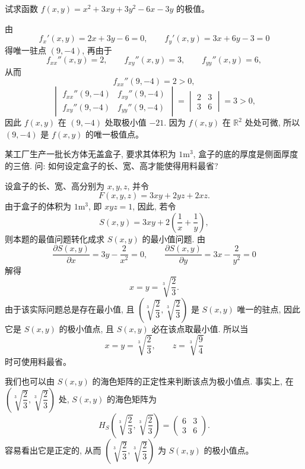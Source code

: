 \documentclass[UTF8,12pt,a4paper,fontset=fandol]{ctexart}
\begin{document}
\begin{example}\label{course-example-14-5-1}\quad 试求函数 $f(x,y)=x^2+3xy+3y^2-6x-3y$ 的极值。

\end{example}
\begin{solve}\quad 由
\[
  f_x'(x,y)=2x+3y-6=0,\qquad
  f_y'(x,y)=3x+6y-3=0
\]
得唯一驻点 $(9,-4)$, 再由于
\[
  f_{xx}''(x,y)=2,\qquad f_{xy}''(x,y)=3,\qquad f_{yy}''(x,y)=6,
\]
从而
\[
  f_{xx}''(9,-4)=2>0,
\]
\[
  \begin{vmatrix}
    f_{xx}''(9,-4) & f_{xy}''(9,-4)\\
    f_{xy}''(9,-4) & f_{yy}''(9,-4)
  \end{vmatrix}
  =
  \begin{vmatrix}
    2 & 3\\
    3 & 6
  \end{vmatrix}
  =3>0,
\]
因此 $f(x,y)$ 在 $(9,-4)$ 处取极小值 $-21$. 因为 $f(x,y)$ 在 $\mathbb R^2$ 处处可微, 所以 $(9,-4)$ 是 $f(x,y)$ 的唯一极值点。

\end{solve}
\begin{example}\label{course-example-14-5-2}\quad 某工厂生产一批长方体无盖盒子, 要求其体积为 $1\mathrm{m}^3$, 盒子的底的厚度是侧面厚度的三倍. 问: 如何设定盒子的长、宽、高才能使得用料最省?

\end{example}
\begin{solve}\quad 设盒子的长、宽、高分别为 $x,y,z$, 并令
\[
  F(x,y,z)=3xy+2yz+2xz.
\]
由于盒子的体积为 $1\mathrm{m}^3$, 即 $xyz=1$, 因此, 若令
\[
  S(x,y)=3xy+2\left(\frac1x+\frac1y\right),
\]
则本题的最值问题转化成求 $S(x,y)$ 的最小值问题. 由
\[
  \frac{\partial S(x,y)}{\partial x}=3y-\frac2{x^2}=0,\qquad
  \frac{\partial S(x,y)}{\partial y}=3x-\frac2{y^2}=0
\]
解得
\[
  x=y=\sqrt[3]{\frac23}.
\]
由于该实际问题总是存在最小值, 且 $\left(\sqrt[3]{\dfrac23},\sqrt[3]{\dfrac23}\right)$ 是 $S(x,y)$ 唯一的驻点, 因此它是 $S(x,y)$ 的极小值点, 且 $S(x,y)$ 必在该点取最小值. 所以当
\[
  x=y=\sqrt[3]{\frac23},\qquad z=\sqrt[3]{\frac94}
\]
时可使用料最省。

我们也可以由 $S(x,y)$ 的海色矩阵的正定性来判断该点为极小值点. 事实上, 在 $\left(\sqrt[3]{\dfrac23},\sqrt[3]{\dfrac23}\right)$ 处, $S(x,y)$ 的海色矩阵为
\[
  H_S\left(\sqrt[3]{\frac23},\sqrt[3]{\frac23}\right)
  =
  \begin{pmatrix}
    6 & 3\\
    3 & 6
  \end{pmatrix}.
\]
容易看出它是正定的, 从而 $\left(\sqrt[3]{\dfrac23},\sqrt[3]{\dfrac23}\right)$ 为 $S(x,y)$ 的极小值点。

\end{solve}
\end{document}
